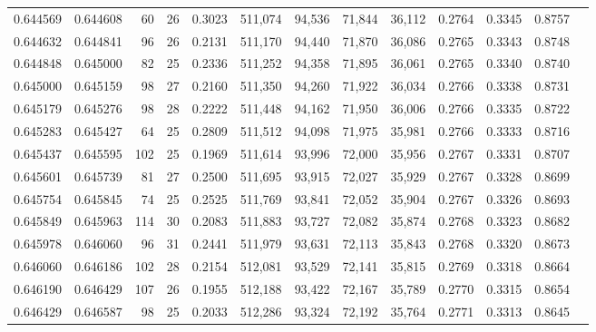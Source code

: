 \begin{tabular}{rrrrrrrrrrrrr}
0.644569 & 0.644608 &     60 &    26 &                                     0.3023 & 511,074 &  94,536 &  71,844 &  36,112 & 0.2764 & 0.3345 & 0.8757 \\
0.644632 & 0.644841 &     96 &    26 &                                     0.2131 & 511,170 &  94,440 &  71,870 &  36,086 & 0.2765 & 0.3343 & 0.8748 \\
0.644848 & 0.645000 &     82 &    25 &                                     0.2336 & 511,252 &  94,358 &  71,895 &  36,061 & 0.2765 & 0.3340 & 0.8740 \\
0.645000 & 0.645159 &     98 &    27 &                                     0.2160 & 511,350 &  94,260 &  71,922 &  36,034 & 0.2766 & 0.3338 & 0.8731 \\
0.645179 & 0.645276 &     98 &    28 &                                     0.2222 & 511,448 &  94,162 &  71,950 &  36,006 & 0.2766 & 0.3335 & 0.8722 \\
0.645283 & 0.645427 &     64 &    25 &                                     0.2809 & 511,512 &  94,098 &  71,975 &  35,981 & 0.2766 & 0.3333 & 0.8716 \\
0.645437 & 0.645595 &    102 &    25 &                                     0.1969 & 511,614 &  93,996 &  72,000 &  35,956 & 0.2767 & 0.3331 & 0.8707 \\
0.645601 & 0.645739 &     81 &    27 &                                     0.2500 & 511,695 &  93,915 &  72,027 &  35,929 & 0.2767 & 0.3328 & 0.8699 \\
0.645754 & 0.645845 &     74 &    25 &                                     0.2525 & 511,769 &  93,841 &  72,052 &  35,904 & 0.2767 & 0.3326 & 0.8693 \\
0.645849 & 0.645963 &    114 &    30 &                                     0.2083 & 511,883 &  93,727 &  72,082 &  35,874 & 0.2768 & 0.3323 & 0.8682 \\
0.645978 & 0.646060 &     96 &    31 &                                     0.2441 & 511,979 &  93,631 &  72,113 &  35,843 & 0.2768 & 0.3320 & 0.8673 \\
0.646060 & 0.646186 &    102 &    28 &                                     0.2154 & 512,081 &  93,529 &  72,141 &  35,815 & 0.2769 & 0.3318 & 0.8664 \\
0.646190 & 0.646429 &    107 &    26 &                                     0.1955 & 512,188 &  93,422 &  72,167 &  35,789 & 0.2770 & 0.3315 & 0.8654 \\
0.646429 & 0.646587 &     98 &    25 &                                     0.2033 & 512,286 &  93,324 &  72,192 &  35,764 & 0.2771 & 0.3313 & 0.8645 \\

\end{tabular}
